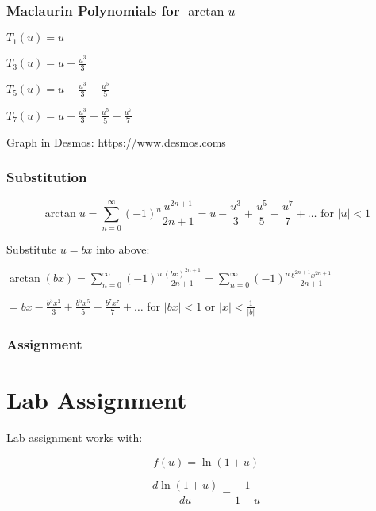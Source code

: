 \documentclass{beamer}
\begin{document}
\begin{frame}
\frametitle{Maclaurin Polynomials for $\arctan u$}


$\displaystyle T_1(u) =u$ \newline
\vspace{0.2 cm}

$\displaystyle T_3(u) = u-\frac{u^3}{3}$ \newline
\vspace{0.2 cm}

$\displaystyle T_5(u) =u-\frac{u^3}{3} + \frac{u^5}{5} $ \newline

\vspace{0.2 cm}

$\displaystyle T_7(u) =u-\frac{u^3}{3} + \frac{u^5}{5}   - \frac{u^7}{7}$ \newline

\vspace{0.6cm}

Graph in Desmos: https://www.desmos.coms

\vspace{6.5 cm}
\end{frame}




\begin{frame}
\frametitle{Substitution}

\begin{equation}
	 \arctan u = \sum_{n=0}^\infty (-1)^n  \frac{u^{2n+1}}{2n+1}= u - \frac{u^3}{3} + \frac{u^5}{5} - \frac{u^7}{7}+\dots  \textrm{ for  } |u| < 1
\end{equation}

Substitute $u=bx$ into above: \newline

$ \displaystyle \arctan (bx) = \sum_{n=0}^\infty (-1)^n  \frac{(bx)^{2n+1}}{2n+1}=\sum_{n=0}^\infty (-1)^n  \frac{b^{2n+1}x^{2n+1}}{2n+1}  $ \newline

\vspace{0.2 in}

$\displaystyle = bx - \frac{b^3 x^3}{3} + \frac{b^5 x^5}{5} - \frac{b^7x^7}{7}+\dots $ for $|bx| < 1$ or $\displaystyle |x| < \frac{1}{|b|}$


\vspace{6.5 cm}
\end{frame}





\begin{frame}
\frametitle{Assignment}
\section{Lab Assignment}

Lab assignment works with:

\begin{equation}
	f(u)=\ln(1+u)
\end{equation}

\vspace{0.5 in}
\begin{equation}
	\frac{d \ln(1+u)}{du} = \frac{1}{1+u}
\end{equation}


\vspace{6.5 cm}
\end{frame}
\end{document}

